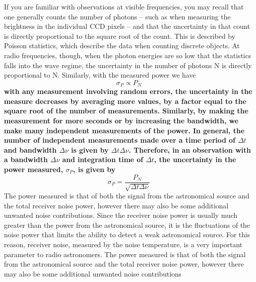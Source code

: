 \documentclass[10pt]{report}
\begin{document}
If you are familiar with observations at visible frequencies, you may recall that one generally counts the number of photons – such as when measuring the brightness in the individual CCD pixels -- and that the uncertainty in that count is directly proportional to the square root of the count.  This is described by Poisson statistics, which describe the data when counting discrete objects.  At radio frequencies, though, when the photon energies are so low that the statistics falls into the wave regime, the uncertainty in the number of photons N is directly proportional to N.  Similarly, with the measured power we have 
\begin{equation}
\sigma_P \propto P_N
\end{equation}
\textbf{with any measurement involving random errors, the uncertainty in the measure decreases by averaging more values, by a factor equal to the square root of the number of measurements.  Similarly, by making the measurement for more seconds or by increasing the bandwidth, we make many independent measurements of the power.  In general, the number of independent measurements made over a time period of $\Delta t$ and bandwidth $\Delta \nu$ is given by $\Delta t \Delta \nu$.  Therefore,  in an observation with a bandwidth $\Delta \nu$ and integration time of $\Delta t$, the uncertainty in the power measured, $\sigma_P$, is given by }
\begin{equation}
\sigma_P=\frac{P_N}{\sqrt{\Delta t \Delta \nu}}
\end{equation}
The power measured is that of both the signal from the astronomical source and the total receiver noise power, however there may also be some additional unwanted noise contributions. Since the receiver noise power is usually much greater than the power from the astronomical source, it is the fluctuations of the noise power that limits the ability to detect a weak astronomical source.  For this reason, receiver noise, measured by the noise temperature, is a very important parameter to radio astronomers. The power measured is that of both the signal from the astronomical source and the total receiver noise power, however there may also be some additional unwanted noise contributions
\end{document}
